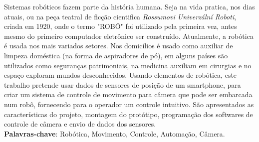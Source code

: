 
\begin{resumo}[RESUMO]
\begin{SingleSpacing}

Sistemas robóticos fazem parte da história humana. Seja na vida pratica, nos dias atuais, ou na peça teatral de ficção cientifica \emph{Rossumovi Univerzální Roboti}, criada em 1920, onde o termo "ROBÔ" foi utilizado pela primeira vez, antes mesmo do primeiro computador eletrônico ser construído.
Atualmente, a robótica é usada nos mais variados setores. Nos domicílios é usado como auxiliar de limpeza doméstica (na forma de aspiradores de pó), em alguns países são utilizados como seguranças patrimoniais, na medicina auxiliam em cirurgias e no espaço exploram mundos desconhecidos. Usando elementos de robótica, este trabalho pretende usar dados de sensores de posição de um smartphone, para criar um sistema de controle de movimento para câmera que pode ser embarcada num robô, fornecendo para o operador um controle intuitivo. São apresentados as características do projeto, montagem do protótipo, programação dos softwares de controle de câmera e envio de dados dos sensores.\\

\textbf{Palavras-chave}: Robótica, Movimento, Controle, Automação, Câmera.

\end{SingleSpacing}
\end{resumo}


